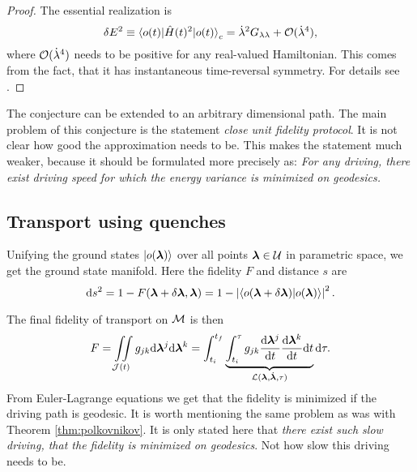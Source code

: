 \begin{proof}
    The essential realization is
    \begin{equation}
        \delta E^2\equiv \braket{o(t)|\hat{H}(t)^2|o(t)}_c=\dot\lambda^2 G_{\lambda\lambda}+\mathcal{O}(\dot\lambda^4),
    \end{equation}
    where $\mathcal{O}(\dot\lambda^4)$ needs to be positive for any real-valued Hamiltonian. This comes from the fact, that it has instantaneous time-reversal symmetry. For details see \cite{Bukov2019}.
\end{proof}

The conjecture can be extended to an arbitrary dimensional path. The main problem of this conjecture is the statement \emph{close unit fidelity protocol}. It is not clear how good the approximation needs to be. This makes the statement much weaker, because it should be formulated more precisely as: \emph{For any driving, there exist driving speed for which the energy variance is minimized on geodesics.}









\subsection{Transport using quenches}
\label{sec:quenches}
Unifying the ground states $\ket{o({\bm\lambda})}$ over all points ${\bm\lambda}\in\mathcal U$ in parametric space, we get the ground state manifold. Here the fidelity $F$ and distance $s$ are
\begin{equation}
    \mathrm{d} s^2 = 1-F({\bm\lambda}+\delta{\bm\lambda},{\bm\lambda}) = 1-\left|\braket{o(\bm{{\bm\lambda}}+\delta\bm{{\bm\lambda}})|o(\bm{{\bm\lambda}})}\right|^2.
    \label{eq:distanceOnM0_1}
\end{equation}

The final fidelity of transport on $\mathcal{M}$ is then
\begin{equation}
    F=\iint\limits_{\mathcal J(t)} g_{jk}\mathrm{d}{\bm\lambda}^j\mathrm{d}{\bm\lambda}^k = \int_{t_i}^{t_f}\underbrace{\int_{t_i}^\tau g_{jk}\frac{\mathrm{d} {\bm\lambda}^j}{\mathrm{d} t}\frac{\mathrm{d} {\bm\lambda}^k}{\mathrm{d} t} \mathrm{d} t}_{\mathcal{L}({\bm\lambda},\dot{{\bm\lambda}},\tau)}\mathrm{d} \tau .
\end{equation}
From Euler-Lagrange equations we get that the fidelity is minimized if the driving path is geodesic. It is worth mentioning the same problem as was with Theorem \ref{thm:polkovnikov}. It is only stated here that \emph{there exist such slow driving, that the fidelity is minimized on geodesics}. Not how slow this driving needs to be. 

